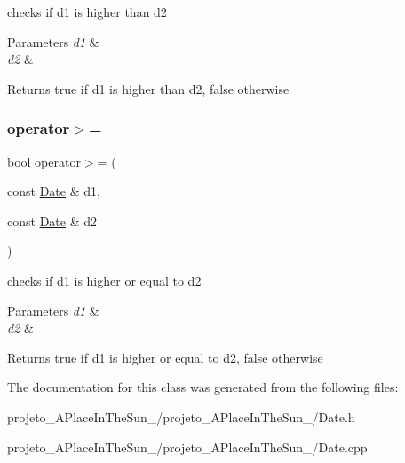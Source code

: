 checks if d1 is higher than d2 


\begin{DoxyParams}{Parameters}
{\em d1} & \\
\hline
{\em d2} & \\
\hline
\end{DoxyParams}
\begin{DoxyReturn}{Returns}
true if d1 is higher than d2, false otherwise 
\end{DoxyReturn}
\hypertarget{class_date_a9aae61020a07731a50cc80927fd8d346}{}\label{class_date_a9aae61020a07731a50cc80927fd8d346} 
\subsubsection{\texorpdfstring{operator$>$=}{operator>=}}
{\footnotesize\ttfamily bool operator$>$= (\begin{DoxyParamCaption}\item[{const \hyperlink{class_date}{Date} \&}]{d1,  }\item[{const \hyperlink{class_date}{Date} \&}]{d2 }\end{DoxyParamCaption})\hspace{0.3cm}{\ttfamily [friend]}}



checks if d1 is higher or equal to d2 


\begin{DoxyParams}{Parameters}
{\em d1} & \\
\hline
{\em d2} & \\
\hline
\end{DoxyParams}
\begin{DoxyReturn}{Returns}
true if d1 is higher or equal to d2, false otherwise 
\end{DoxyReturn}


The documentation for this class was generated from the following files\+:\begin{DoxyCompactItemize}
\item 
projeto\+\_\+\+A\+Place\+In\+The\+Sun\+\_/projeto\+\_\+\+A\+Place\+In\+The\+Sun\+\_/Date.\+h\item 
projeto\+\_\+\+A\+Place\+In\+The\+Sun\+\_/projeto\+\_\+\+A\+Place\+In\+The\+Sun\+\_/Date.\+cpp\end{DoxyCompactItemize}
